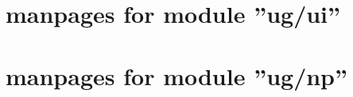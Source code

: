 \newpage
{
\small
\tableofcontents
}
\clearpage

\thispagestyle{plain}
\section{manpages for module ''ug/ui''}
\renewcommand{\sectitle}{ug/ui}


\thispagestyle{plain}
\section{manpages for module ''ug/np''}
\renewcommand{\sectitle}{ug/np}





